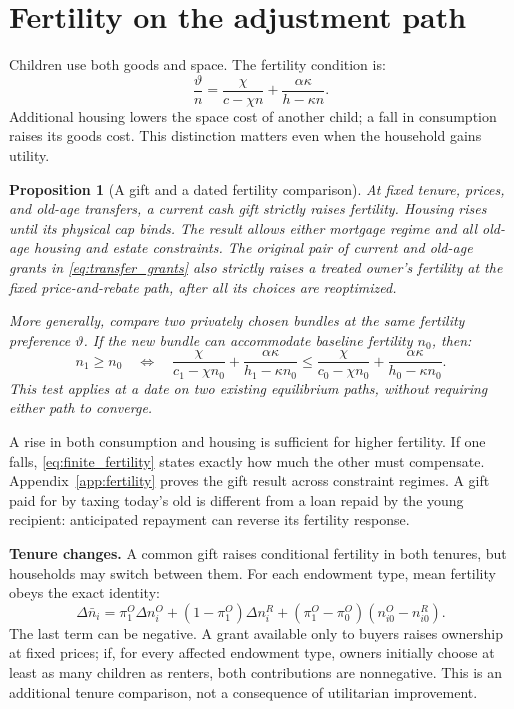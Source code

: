 \documentclass[11pt]{article}
\newtheorem{proposition}{Proposition}
\begin{document}
\section{Fertility on the adjustment path}

Children use both goods and space. The fertility condition is:
\begin{equation}
\frac\vartheta n=\frac\chi{c-\chi n}+\frac{\alpha\kappa}{h-\kappa n}.
\label{eq:new_fertility}
\end{equation}
Additional housing lowers the space cost of another child; a fall in
consumption raises its goods cost. This distinction matters even when the
household gains utility.

\begin{proposition}[A gift and a dated fertility comparison]
\label{prop:fertility}
At fixed tenure, prices, and old-age transfers, a current cash gift strictly
raises fertility. Housing rises until its physical cap binds. The result
allows either mortgage regime and all old-age housing and estate constraints.
The original pair of current and old-age grants in
\eqref{eq:transfer_grants} also strictly raises a treated owner's fertility
at the fixed price-and-rebate path, after all its choices are reoptimized.

More generally, compare two privately chosen bundles at the same fertility
preference $\vartheta$. If the new bundle can accommodate baseline fertility
$n_0$, then:
\begin{equation}
\boxed{\quad
n_1\ge n_0\quad\Longleftrightarrow\quad
\frac\chi{c_1-\chi n_0}+\frac{\alpha\kappa}{h_1-\kappa n_0}
\le \frac\chi{c_0-\chi n_0}+\frac{\alpha\kappa}{h_0-\kappa n_0}.
\quad}
\label{eq:finite_fertility}
\end{equation}
This test applies at a date on two existing equilibrium paths, without
requiring either path to converge.
\end{proposition}

A rise in both consumption and housing is sufficient for higher fertility.
If one falls, \eqref{eq:finite_fertility} states exactly how much the other
must compensate. Appendix~\ref{app:fertility} proves the gift result across
constraint regimes. A gift paid for by taxing today's old is different from
a loan repaid by the young recipient: anticipated repayment can reverse its
fertility response.

\textbf{Tenure changes.} A common gift raises conditional fertility in both
tenures, but households may switch between them. For each endowment type,
mean fertility obeys the exact identity:
\begin{equation}
\Delta\bar n_i=\pi_1^O\Delta n_i^O+(1-\pi_1^O)\Delta n_i^R
 +(\pi_1^O-\pi_0^O)(n_{i0}^O-n_{i0}^R).
\label{eq:tenure_fertility}
\end{equation}
The last term can be negative. A grant available only to buyers raises
ownership at fixed prices; if, for every affected endowment type, owners initially choose at least
as many children as renters, both contributions are nonnegative. This is an
additional tenure comparison, not a consequence of utilitarian improvement.
\end{document}
